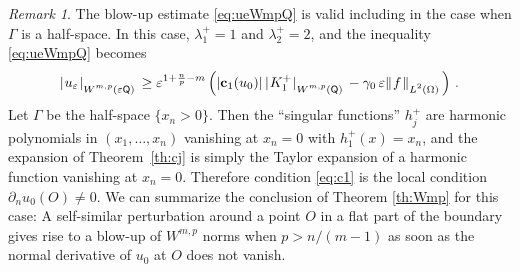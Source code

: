 \documentclass[titlepage,12pt]{amsart}
\theoremstyle{definition}
\theoremstyle{remark}
\newtheorem{remark}[theorem]{Remark}
\numberwithin{equation}{section}
\newcommand{\ee}{\hskip0.15ex}
\newcommand{\dd}[1]{_{\raise-0.6ex\hbox{$\scriptstyle #1$}}}
\newcommand {\Norm}[2]{ \mathchoice
    {|\ee #1\ee|\dd{#2}\,}
    {| #1 |_{#2}}
    {| #1 |_{#2}}
    {| #1 |_{#2}} }
\newcommand {\DNorm}[2]{ \mathchoice
    {\|\ee #1\ee\|\dd{#2}\,}
    {\| #1 \|_{#2}}
    {\| #1 \|_{#2}}
    {\| #1 \|_{#2}} }
\newcommand{\rQ}{{\mathsf{Q}}}
\begin{document}
\begin{remark}
The blow-up estimate \eqref{eq:ueWmpQ} is valid including in the case when $\Gamma$ is a half-space. In this case, $\lambda^+_1=1$ and $\lambda^+_2=2$, and the inequality \eqref{eq:ueWmpQ} becomes
\[
   \Norm{u_\varepsilon}{W^{m,p}(\varepsilon\rQ)} \ge 
   \varepsilon^{1+\frac{n}{p}-m} \left( 
   |\mathbf{c}_1(u_0)|\, \Norm{K^+_1}{W^{m,p}(\rQ)}
   - \gamma_0\,\varepsilon \DNorm{f}{L^2(\Omega)}
   \right)\,.
\]
Let $\Gamma$ be the half-space $\{x_{n}>0\}$. Then the ``singular functions'' $h_{j}^{+}$ are harmonic polynomials in $(x_{1},\dots,x_{n})$ vanishing at $x_{n}=0$ with $h_{1}^{+}(x)=x_{n}$, and the expansion of Theorem~\ref{th:cj} is simply the Taylor expansion of a harmonic function vanishing at $x_{n}=0$.
Therefore condition \eqref{eq:c1} is the local condition $\partial_nu_0(O)\neq0$.
We can summarize the conclusion of Theorem \ref{th:Wmp} for this case: A self-similar perturbation around a point $O$ in a flat part of the boundary gives rise to a blow-up of $W^{m,p}$ norms when $p>n/(m-1)$
as soon as the normal derivative of $u_{0}$ at $O$ does not vanish.
\end{remark}
\end{document}
